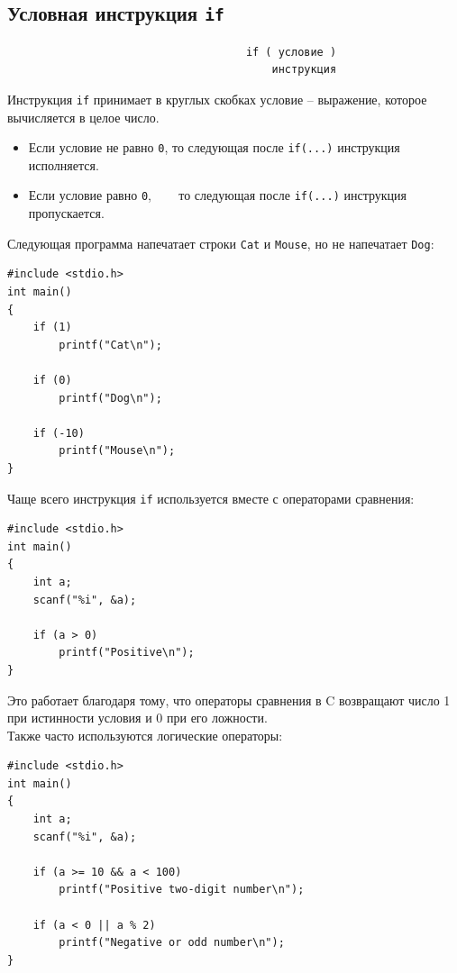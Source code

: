 \documentclass[10pt]{article}
\begin{document}
\subsection*{Условная инструкция \texttt{if}}
\begin{lstlisting}
                                     if ( условие )
                                         инструкция
\end{lstlisting}
Инструкция \texttt{if} принимает в круглых скобках условие -- выражение, которое вычисляется в целое число. 
\begin{itemize}
\item Если условие не равно \texttt{0}, то следующая после \texttt{if(...)} инструкция исполняется.
\item Если условие равно \texttt{0}, ~~~ то следующая после \texttt{if(...)} инструкция пропускается.
\end{itemize}
Следующая программа напечатает строки \texttt{Cat} и \texttt{Mouse}, но не напечатает \texttt{Dog}:
\begin{lstlisting}
#include <stdio.h>
int main()
{
    if (1)
        printf("Cat\n");

    if (0)
        printf("Dog\n");
        
    if (-10)
        printf("Mouse\n");
}
\end{lstlisting}
Чаще всего инструкция \texttt{if} используется вместе с операторами сравнения:
\begin{lstlisting}
#include <stdio.h>
int main()
{
    int a;
    scanf("%i", &a);

    if (a > 0)
        printf("Positive\n");
}
\end{lstlisting}
Это работает благодаря тому, что операторы сравнения в C возвращают число 1 при истинности условия и 0 при его ложности.\\

\noindent Также часто используются логические операторы:
\begin{lstlisting}
#include <stdio.h>
int main()
{
    int a;
    scanf("%i", &a);

    if (a >= 10 && a < 100)
        printf("Positive two-digit number\n");
        
    if (a < 0 || a % 2)
        printf("Negative or odd number\n");
}
\end{lstlisting}
\end{document}
